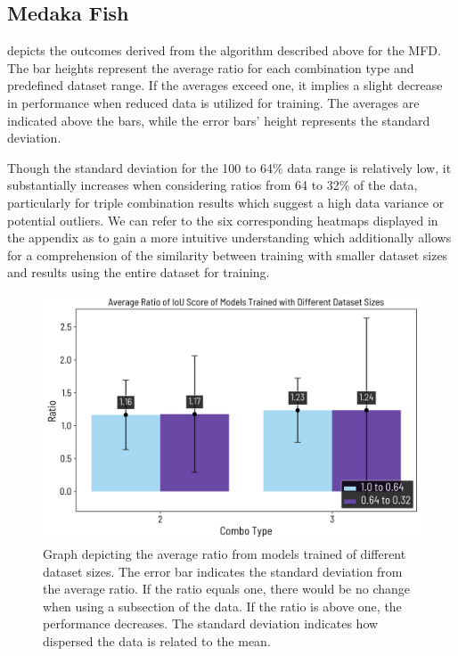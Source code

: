 \subsection{Medaka Fish}
 depicts the outcomes derived from the algorithm described above for the \ac{MFD}. The bar heights represent the average ratio for each combination type and predefined dataset range. If the averages exceed one, it implies a slight decrease in performance when reduced data is utilized for training. The averages are indicated above the bars, while the error bars' height represents the standard deviation.

Though the standard deviation for the 100 to 64\% data range is relatively low, it substantially increases when considering ratios from 64 to 32\% of the data, particularly for triple combination results which suggest a high data variance or potential outliers. We can refer to the six corresponding heatmaps displayed in the appendix as  to gain a more intuitive understanding which additionally allows for a comprehension of the similarity between training with smaller dataset sizes and results using the entire dataset for training.
\begin{figure}[H]%
  \centering
  \includegraphics[width=\imgWidthM]{images/3_ratio_ablation_summary_medaka.png}
  \caption[Ratio of IoU computed on different dataset sizes (Medaka)]{Graph depicting the average ratio from models trained of different dataset sizes. The error bar indicates the standard deviation from the average ratio. If the ratio equals one, there would be no change when using a subsection of the data. If the ratio is above one, the performance decreases. The standard deviation indicates how dispersed the data is related to the mean.}
  \label{ablation_graph_medaka_fish}
\end{figure}
